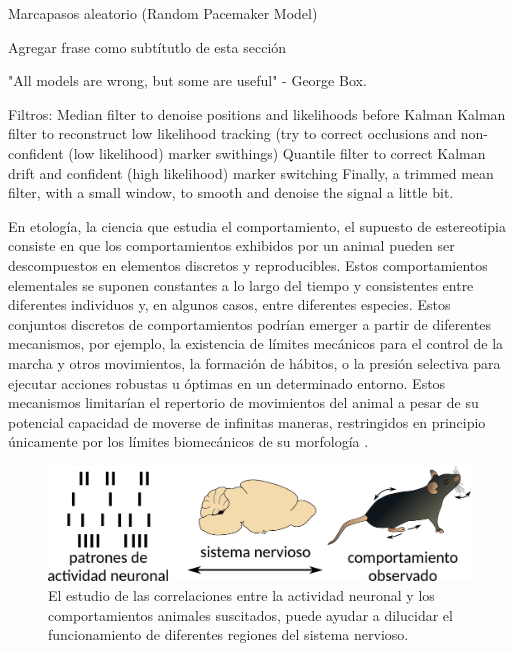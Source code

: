 
Marcapasos aleatorio (Random Pacemaker Model)

Agregar frase como subtítutlo de esta sección

"All models are wrong, but some are useful" - George Box.

Filtros:
Median filter to denoise positions and likelihoods before Kalman
Kalman filter to reconstruct low likelihood tracking (try to correct occlusions and non-confident (low likelihood) marker swithings)
Quantile filter to correct Kalman drift and confident (high likelihood) marker switching
Finally, a trimmed mean filter, with a small window, to smooth and denoise the signal a little bit.


En etología, la ciencia que estudia el comportamiento, el supuesto de estereotipia consiste en que los comportamientos exhibidos por un animal pueden ser descompuestos en elementos discretos y reproducibles. Estos comportamientos elementales se suponen constantes a lo largo del tiempo y consistentes entre diferentes individuos y, en algunos casos, entre diferentes especies. Estos conjuntos discretos de comportamientos podrían emerger a partir de diferentes mecanismos, por ejemplo, la existencia de límites mecánicos para el control de la marcha y otros movimientos, la formación de hábitos, o la presión selectiva para ejecutar acciones robustas u óptimas en un determinado entorno. Estos mecanismos limitarían el repertorio de movimientos del animal a pesar de su potencial capacidad de moverse de infinitas maneras, restringidos en principio únicamente por los límites biomecánicos de su morfología \cite{berman_mapping,lehner_stereotipy}.

\begin{figure}[h!]
    \centering
    \includegraphics[width=0.6\linewidth]{figuras/introduccion/actividad_comportamiento.pdf}
    \caption{El estudio de las correlaciones entre la actividad neuronal y los comportamientos animales suscitados, puede ayudar a dilucidar el funcionamiento de diferentes regiones del sistema nervioso.}
    \label{fig:actividad_neuronal}
\end{figure}

